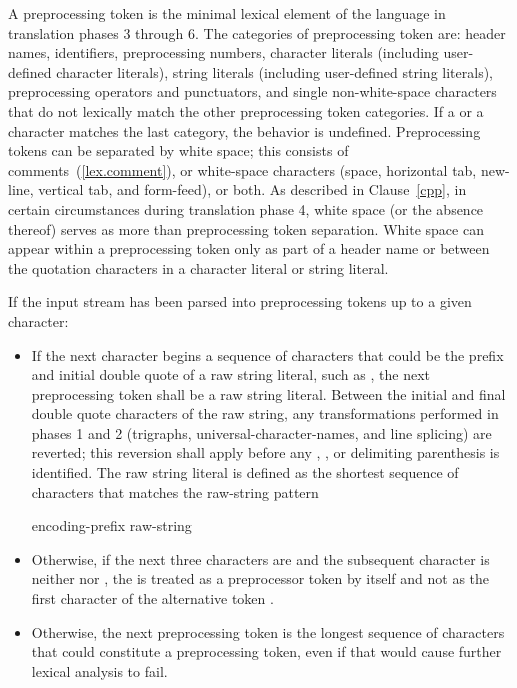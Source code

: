 \pnum
A preprocessing token is the minimal lexical element of the language in translation
phases 3 through 6. The categories of preprocessing token are: header names,
identifiers, preprocessing numbers, character literals (including user-defined character
literals), string literals (including user-defined string literals), preprocessing
operators and punctuators, and single non-white-space characters that do not lexically
match the other preprocessing token categories. If a  or a  character
matches the last category, the behavior is undefined. Preprocessing tokens can be
separated by
%
white space;
%
this consists of comments~(\ref{lex.comment}), or white-space
characters (space, horizontal tab, new-line, vertical tab, and
form-feed), or both. As described in Clause~\ref{cpp}, in certain
circumstances during translation phase 4, white space (or the absence
thereof) serves as more than preprocessing token separation. White space
can appear within a preprocessing token only as part of a header name or
between the quotation characters in a character literal or string
literal.

\pnum
If the input stream has been parsed into preprocessing tokens up to a
given character:

\begin{itemize}
\item If the next character begins a sequence of characters that could be the prefix
and initial double quote of a raw string literal, such as , the next preprocessing
token shall be a raw string literal. Between the initial and final
double quote characters of the raw string, any transformations performed in phases
1 and 2 (trigraphs, universal-character-names, and line splicing) are reverted; this reversion
shall apply before any , , or delimiting
parenthesis is identified. The raw string literal is defined as the shortest sequence
of characters that matches the raw-string pattern

\begin{ncbnf}
encoding-prefix\opt{}  raw-string
\end{ncbnf}

\item Otherwise, if the next three characters are \tcode{<::} and the subsequent character
is neither \tcode{:} nor \tcode{>}, the \tcode{<} is treated as a preprocessor token by
itself and not as the first character of the alternative token \tcode{<:}.

\item Otherwise,
the next preprocessing token is the longest sequence of
characters that could constitute a preprocessing token, even if that
would cause further lexical analysis to fail.
\end{itemize}

